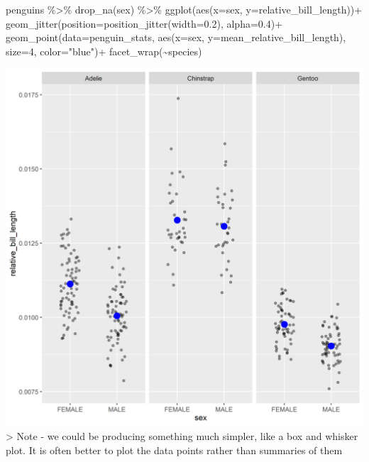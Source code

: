 \documentclass[
]{book}
\newenvironment{Shaded}{\begin{snugshade}}{\end{snugshade}}
\newcommand{\AttributeTok}[1]{\textcolor[rgb]{0.77,0.63,0.00}{#1}}
\newcommand{\DecValTok}[1]{\textcolor[rgb]{0.00,0.00,0.81}{#1}}
\newcommand{\FloatTok}[1]{\textcolor[rgb]{0.00,0.00,0.81}{#1}}
\newcommand{\FunctionTok}[1]{\textcolor[rgb]{0.00,0.00,0.00}{#1}}
\newcommand{\NormalTok}[1]{#1}
\newcommand{\SpecialCharTok}[1]{\textcolor[rgb]{0.00,0.00,0.00}{#1}}
\newcommand{\StringTok}[1]{\textcolor[rgb]{0.31,0.60,0.02}{#1}}
\begin{document}
\begin{Shaded}
\begin{Highlighting}[]
\NormalTok{penguins }\SpecialCharTok{\%\textgreater{}\%} 
  \FunctionTok{drop\_na}\NormalTok{(sex) }\SpecialCharTok{\%\textgreater{}\%} 
  \FunctionTok{ggplot}\NormalTok{(}\FunctionTok{aes}\NormalTok{(}\AttributeTok{x=}\NormalTok{sex, }
             \AttributeTok{y=}\NormalTok{relative\_bill\_length))}\SpecialCharTok{+}
  \FunctionTok{geom\_jitter}\NormalTok{(}\AttributeTok{position=}\FunctionTok{position\_jitter}\NormalTok{(}\AttributeTok{width=}\FloatTok{0.2}\NormalTok{), }
              \AttributeTok{alpha=}\FloatTok{0.4}\NormalTok{)}\SpecialCharTok{+}
  \FunctionTok{geom\_point}\NormalTok{(}\AttributeTok{data=}\NormalTok{penguin\_stats, }\FunctionTok{aes}\NormalTok{(}\AttributeTok{x=}\NormalTok{sex, }
                                     \AttributeTok{y=}\NormalTok{mean\_relative\_bill\_length), }
             \AttributeTok{size=}\DecValTok{4}\NormalTok{, }
             \AttributeTok{color=}\StringTok{"blue"}\NormalTok{)}\SpecialCharTok{+}
  \FunctionTok{facet\_wrap}\NormalTok{(}\SpecialCharTok{\textasciitilde{}}\NormalTok{species)}
\end{Highlighting}
\end{Shaded}

\includegraphics[width=1\linewidth]{images/bluedotplot}
\textgreater{} Note - we could be producing something much simpler, like a box and whisker plot. It is often better to plot the data points rather than summaries of them
\end{document}
